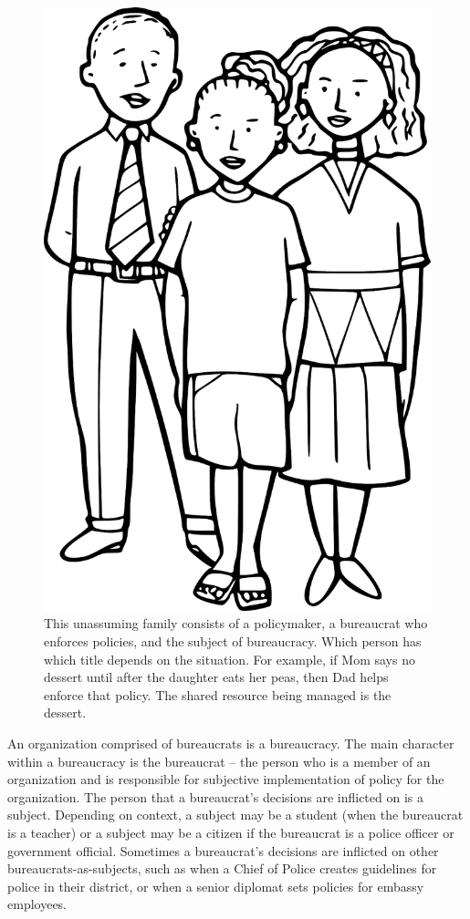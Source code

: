 \begin{figure}
    \centering
    \includegraphics[width=.6\textwidth]{images/family-father-mother-daughter-28725_1280_pixabay.png}
    \caption{This unassuming family consists of a policymaker, a bureaucrat who enforces policies, and the subject of bureaucracy. Which person has which title depends on the situation. For example, if Mom says no dessert until after the daughter eats her peas, then Dad helps enforce that policy. The shared resource being managed is the dessert. }
    \label{fig:family-of-bureaucrats}
\end{figure}

An organization comprised of bureaucrats is a \gls{bureaucracy}. 
\marginpar{[Glossary]}
The main character within a bureaucracy is the \gls{bureaucrat} -- the person who is a member of an organization and is responsible for subjective implementation of policy for the organization. The person that a bureaucrat's decisions are inflicted on is a \gls{subject}.  Depending on context, a subject may be a student (when the bureaucrat is a teacher)
or a subject may be a citizen if the bureaucrat is a police officer 
or government official. Sometimes a bureaucrat's decisions are inflicted on other bureaucrats-as-subjects, such as when a Chief of Police creates guidelines for police in their district, or when a senior diplomat sets policies for embassy employees. 


